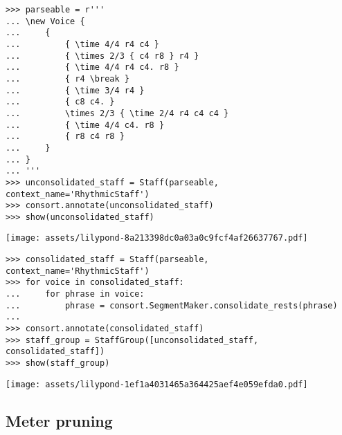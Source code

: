 \begin{abjadbookoutput}
\begin{singlespacing}
\vspace{-0.5\baselineskip}
\begin{lstlisting}
>>> parseable = r'''
... \new Voice {
...     {
...         { \time 4/4 r4 c4 }
...         { \times 2/3 { c4 r8 } r4 }
...         { \time 4/4 r4 c4. r8 }
...         { r4 \break }
...         { \time 3/4 r4 }
...         { c8 c4. }
...         \times 2/3 { \time 2/4 r4 c4 c4 }
...         { \time 4/4 c4. r8 }
...         { r8 c4 r8 }
...     }
... }
... '''
>>> unconsolidated_staff = Staff(parseable, context_name='RhythmicStaff')
>>> consort.annotate(unconsolidated_staff)
>>> show(unconsolidated_staff)
\end{lstlisting}
\noindent\texttt{[image: assets/lilypond-8a213398dc0a03a0c9fcf4af26637767.pdf]}
\end{singlespacing}
\end{abjadbookoutput}

\begin{comment}
<abjad>
consolidated_staff = Staff(parseable, context_name='RhythmicStaff')
for voice in consolidated_staff:
    for phrase in voice:
        phrase = consort.SegmentMaker.consolidate_rests(phrase)

consort.annotate(consolidated_staff)
staff_group = StaffGroup([unconsolidated_staff, consolidated_staff])
show(staff_group)
</abjad>
\end{comment}

\begin{abjadbookoutput}
\begin{singlespacing}
\vspace{-0.5\baselineskip}
\begin{lstlisting}
>>> consolidated_staff = Staff(parseable, context_name='RhythmicStaff')
>>> for voice in consolidated_staff:
...     for phrase in voice:
...         phrase = consort.SegmentMaker.consolidate_rests(phrase)
...
>>> consort.annotate(consolidated_staff)
>>> staff_group = StaffGroup([unconsolidated_staff, consolidated_staff])
>>> show(staff_group)
\end{lstlisting}
\noindent\texttt{[image: assets/lilypond-1ef1a4031465a364425aef4e059efda0.pdf]}
\end{singlespacing}
\end{abjadbookoutput}

\subsection{Meter pruning}
\label{ssec:meter-pruning}

